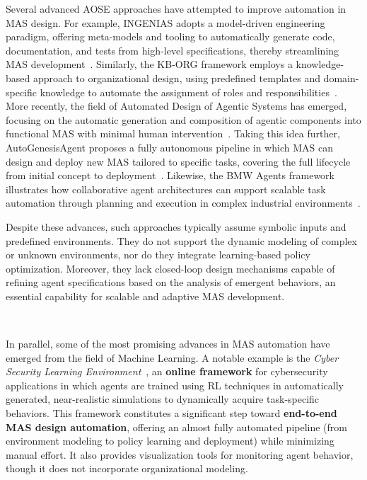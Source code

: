 \documentclass[pdflatex,sn-mathphys-num]{sn-jnl}%
\theoremstyle{thmstyleone}%
\theoremstyle{thmstyletwo}%
\theoremstyle{thmstylethree}%
\begin{document}
Several advanced AOSE approaches have attempted to improve automation in MAS design. For example, INGENIAS adopts a model-driven engineering paradigm, offering meta-models and tooling to automatically generate code, documentation, and tests from high-level specifications, thereby streamlining MAS development~\cite{Pavon2003}. Similarly, the KB-ORG framework employs a knowledge-based approach to organizational design, using predefined templates and domain-specific knowledge to automate the assignment of roles and responsibilities~\cite{Sims2008}. More recently, the field of Automated Design of Agentic Systems has emerged, focusing on the automatic generation and composition of agentic components into functional MAS with minimal human intervention~\cite{smith2024automated}. Taking this idea further, AutoGenesisAgent proposes a fully autonomous pipeline in which MAS can design and deploy new MAS tailored to specific tasks, covering the full lifecycle from initial concept to deployment~\cite{harper2024autogenesisagent}. Likewise, the BMW Agents framework illustrates how collaborative agent architectures can support scalable task automation through planning and execution in complex industrial environments~\cite{crawford2024bmw}.

Despite these advances, such approaches typically assume symbolic inputs and predefined environments. They do not support the dynamic modeling of complex or unknown environments, nor do they integrate learning-based policy optimization. Moreover, they lack closed-loop design mechanisms capable of refining agent specifications based on the analysis of emergent behaviors, an essential capability for scalable and adaptive MAS development.

\

\noindent In parallel, some of the most promising advances in MAS automation have emerged from the field of Machine Learning. A notable example is the \textit{Cyber Security Learning Environment}~\cite{hammar2023scalable}, an \textbf{online framework} for cybersecurity applications in which agents are trained using RL techniques in automatically generated, near-realistic simulations to dynamically acquire task-specific behaviors. This framework constitutes a significant step toward \textbf{end-to-end MAS design automation}, offering an almost fully automated pipeline (from environment modeling to policy learning and deployment) while minimizing manual effort. It also provides visualization tools for monitoring agent behavior, though it does not incorporate organizational modeling.
\end{document}
